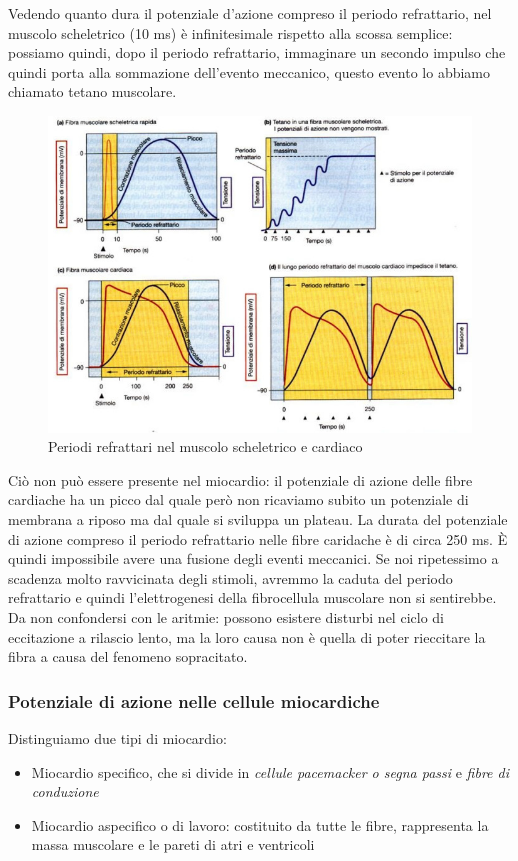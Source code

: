 \documentclass[a4paper,12pt]{article}
\begin{document}
Vedendo quanto dura il potenziale d'azione compreso il periodo refrattario, nel muscolo scheletrico (10 ms) è infinitesimale rispetto alla scossa semplice: possiamo quindi, dopo il periodo refrattario, immaginare un secondo impulso che quindi porta alla sommazione dell'evento meccanico, questo evento lo abbiamo chiamato tetano muscolare.
\begin{figure}[H]
\centering
\includegraphics[scale=0.4]{immagine/refrattario.jpg}
\caption{Periodi refrattari nel muscolo scheletrico e cardiaco}
\end{figure}
 Ciò non può essere presente nel miocardio: il potenziale di azione delle fibre cardiache ha un picco dal quale però non ricaviamo subito un potenziale di membrana a riposo ma dal quale  si sviluppa un plateau. La durata del potenziale di azione compreso il periodo refrattario nelle fibre caridache è di circa 250 ms. È quindi impossibile avere una fusione degli eventi meccanici. Se noi ripetessimo a scadenza molto ravvicinata degli stimoli, avremmo la caduta del periodo refrattario e quindi l'elettrogenesi della fibrocellula muscolare non si sentirebbe. Da non confondersi con le aritmie: possono esistere disturbi nel ciclo di eccitazione a rilascio lento, ma la loro causa non è quella di poter rieccitare la fibra a causa del fenomeno sopracitato.

\subsubsection{Potenziale di azione nelle cellule miocardiche}
Distinguiamo due tipi di miocardio:
\begin{itemize}
\item{Miocardio specifico, che si divide in \emph{cellule pacemacker o segna passi} e \emph{fibre di conduzione}}
\item{Miocardio aspecifico o di lavoro: costituito da tutte le fibre, rappresenta la massa muscolare e le pareti di atri e ventricoli}
\end{itemize}
\end{document}
